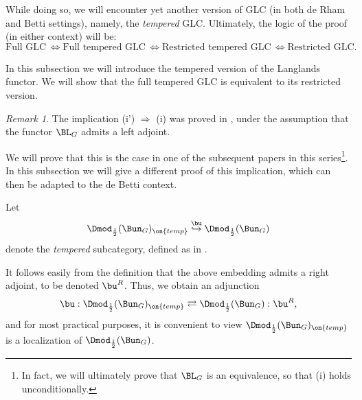 \documentclass[9pt]{amsart}
\theoremstyle{remark}
\newtheorem{rem}[subsubsection]{Remark}
\theoremstyle{definition}
\theoremstyle{remark}
\numberwithin{equation}{section}
\begin{document}
\medskip

While doing so, we will encounter yet another version of GLC
(in both de Rham and Betti settings), namely, the \emph{tempered} GLC. Ultimately, the logic of the proof 
(in either context) will be:
$$\text{Full GLC}\, \Leftrightarrow \text{Full tempered GLC}\, \Leftrightarrow \text{Restricted tempered GLC}\, 
\Leftrightarrow \text{Restricted GLC}.$$


In this subsection we will introduce the tempered version of the Langlands functor. We will show that the 
full tempered GLC is equivalent to its restricted version. 

\begin{rem}

The implication (i') $\Rightarrow$ (i) was proved in \cite[Sect. 21.4]{AGKRRV}, under the assumption that the functor
$\BL_G$ admits a left adjoint.  

\medskip

We will prove that this is the case in one of the subsequent papers in this series\footnote{In fact, we will ultimately prove
that $\BL_G$ is an equivalence, so that (i) holds unconditionally.}. In this subsection we will give a different proof 
of this implication, which can then be adapted to the de Betti context.  

\end{rem}

%
%
%
%
%

\sssec{} \label{sss:temp}

Let 
$$\Dmod_{\frac{1}{2}}(\Bun_G)_{\on{temp}}\overset{\bu}\hookrightarrow \Dmod_{\frac{1}{2}}(\Bun_G)$$
denote the \emph{tempered} subcategory, defined as in \cite[Sect. 17.8.4]{AG}. 

\medskip

It follows easily from the definition that the above embedding admits a right adjoint, to be denoted $\bu^R$. 
Thus, we obtain an adjunction
$$\bu:\Dmod_{\frac{1}{2}}(\Bun_G)_{\on{temp}}\rightleftarrows \Dmod_{\frac{1}{2}}(\Bun_G):\bu^R,$$
and for most practical purposes, it is convenient to view $\Dmod_{\frac{1}{2}}(\Bun_G)_{\on{temp}}$
is a localization of $\Dmod_{\frac{1}{2}}(\Bun_G)$. 
\end{document}
